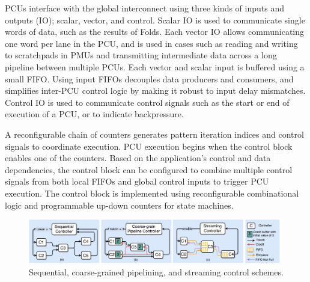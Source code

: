PCUs interface with the global interconnect using three kinds of inputs and outputs (IO); scalar, vector, and control. Scalar IO is used to communicate
single words of data, such as the results of Folds. Each vector IO allows communicating one word per lane in the PCU, and is used in cases such as
reading and writing to scratchpads in PMUs and transmitting intermediate data across a long pipeline between multiple PCUs.
Each vector and scalar input is buffered using a small FIFO. Using input FIFOs decouples data producers and consumers, and simplifies inter-PCU control
logic by making it robust to input delay mismatches. Control IO is used to communicate control signals such as the start or end of execution of a PCU,
or to indicate backpressure.

A reconfigurable chain of counters generates pattern iteration
indices and control signals to coordinate execution. PCU execution begins when the control block enables one of the
counters. Based on the application's control and data dependencies, the control block can be configured to combine
multiple control signals from both local FIFOs and global control inputs to trigger PCU execution.
The control block is implemented using reconfigurable combinational logic and programmable up-down counters
for state machines.


\begin{figure}[ht]
  \centering
  \includegraphics[width=1\textwidth]{figs/control.pdf}
  \vspace{-20pt}
  \caption{Sequential, coarse-grained pipelining, and streaming control schemes.}
  \label{fig:control}
\end{figure}

